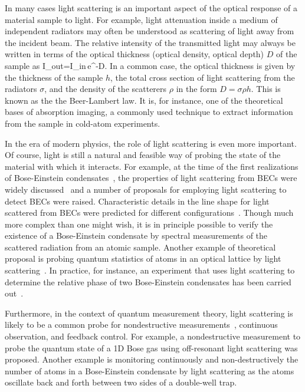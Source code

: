 In many cases light scattering is an important aspect of the optical response of a material sample to light. For example, light attenuation inside a medium of independent radiators may often be understood as scattering of light away from the incident beam. The relative intensity of the transmitted light may always be written in terms of the optical thickness (optical density, optical depth) $D$ of the sample as
\bea
I_{out}=I_{in}\,e^{-D}.
\label{BEER'S_LAW}
\eea
In a common case, the optical thickness is given by the thickness of the sample $h$, the total cross section of light scattering from the radiators $\sigma$, and the density of the scatterers $\rho$ in the form $D=\sigma\rho h$. This is known as the the Beer-Lambert law. It is, for instance, one of the theoretical bases of absorption imaging, a commonly used technique to extract information from the sample in cold-atom experiments. 

In the era of modern physics, the role of light scattering is even more important. Of course, light is still a natural and feasible way of probing the state of the material with which it interacts. For example, at the time of the first realizations of Bose-Einstein condensates~\cite{Anderson14071995,PhysRevLett.75.3969}, the properties of light scattering from BECs were widely discussed~\cite{PhysRevA.43.6444,PhysRevA.51.3896,PhysRevA.52.3033,PhysRevLett.71.1339}  and a number of proposals for employing light scattering to detect BECs were raised. Characteristic details in the line shape for light scattered from BECs were predicted for different configurations~\cite{PhysRevLett.72.2375,PhysRevA.50.R3565,PhysRevLett.75.1927,PhysRevLett.76.1774,PhysRevA.54.R2543}. Though much more complex than one might wish, it is in principle possible to verify the existence of a Bose-Einstein condensate by spectral measurements of the scattered radiation from an atomic sample. Another example of theoretical proposal is probing quantum statistics of atoms in an optical lattice by light scattering~\cite{PhysRevA.76.053618}. In practice, for instance, an experiment that uses light scattering to determine the relative phase of two Bose-Einstein condensates has been carried out~\cite{Saba25032005}.

Furthermore, in the context of quantum measurement theory, light scattering is likely to be a common probe for nondestructive measurements~\cite{RevModPhys.68.1}, continuous observation, and feedback control. For example, a nondestructive measurement to probe the quantum state of a 1D Bose gas using off-resonant light scattering was proposed\cite{PhysRevLett.107.270403}. Another example is monitoring continuously and non-destructively the number of atoms in a Bose-Einstein condensate by light scattering as the atoms oscillate back and forth between two sides of a double-well trap\cite{NJP.JJ}.

